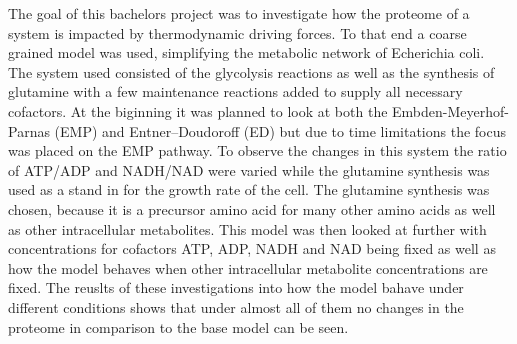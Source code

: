 The goal of this bachelors project was to investigate how the proteome of a system is impacted by thermodynamic driving forces. To that end a coarse grained model was used, simplifying the metabolic network of Echerichia coli.
The system used consisted of the glycolysis reactions as well as the synthesis of glutamine with a few maintenance reactions added to supply all necessary cofactors. 
At the biginning it was planned to look at both the Embden-Meyerhof-Parnas (EMP) and Entner–Doudoroff (ED) but due to time limitations the focus was placed on the EMP pathway.
To observe the changes in this system the ratio of ATP/ADP and NADH/NAD were varied while the glutamine synthesis was used as a stand in for the growth rate of the cell. The glutamine synthesis was chosen, because it is a precursor amino acid for many other amino acids as well as other intracellular metabolites.
This model was then looked at further with concentrations for cofactors ATP, ADP, NADH and NAD being fixed as well as how the model behaves when other intracellular metabolite concentrations are fixed. 
The reuslts of these investigations into how the model bahave under different conditions shows that under almost all of them no changes in the proteome in comparison to the base model can be seen.